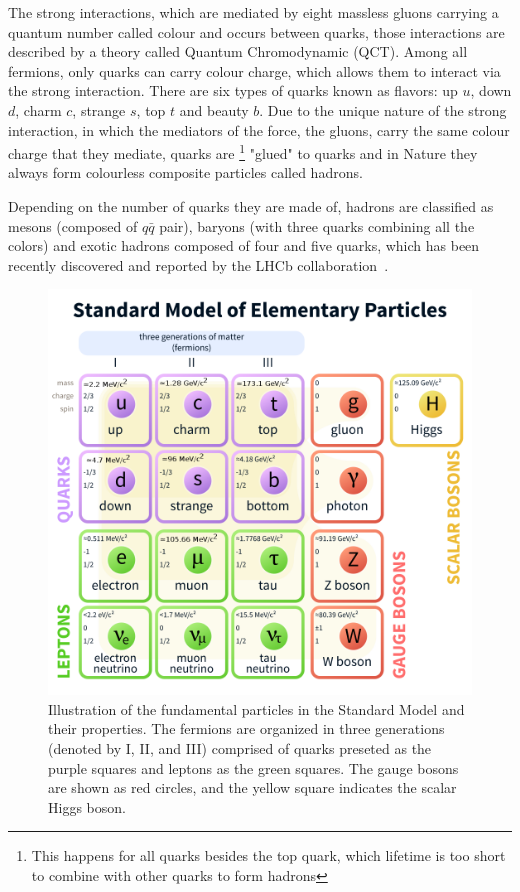 The strong interactions, which are mediated by eight massless gluons carrying a quantum number called colour and occurs between quarks, those interactions are described by a theory called Quantum Chromodynamic (QCT). Among all fermions, only quarks can carry colour charge, which allows them to interact via the strong interaction. There are six types of quarks known as flavors: up $u$,  down $d$, charm $c$, strange $s$, top $t$ and beauty $b$.  Due to the unique nature of the strong interaction, in which the mediators of the force, the gluons, carry the same colour charge that they mediate, quarks are \footnote{This happens for all quarks besides the top quark, which lifetime is too short to combine with other quarks to form hadrons} "glued" to quarks and in Nature they always form colourless composite particles called hadrons. 

Depending on the number of quarks they are made of, hadrons are classified as mesons (composed of $q\bar{q}$ pair), baryons (with three quarks combining all the colors) and exotic hadrons composed of four and five quarks, which has been recently discovered and reported by the LHCb collaboration~\cite{pentaquarks}.  

\begin{figure}
\centering
\includegraphics[scale=1.0]{figures/SM.png}
\caption{Illustration of the fundamental particles in the Standard Model and their properties. The fermions are organized in three generations (denoted by I, II, and III) comprised of quarks preseted as the purple squares and leptons as the green squares. The  gauge bosons are shown as red circles, and the yellow square indicates the scalar Higgs boson. 
\label{fig:SM}}
\end{figure}

